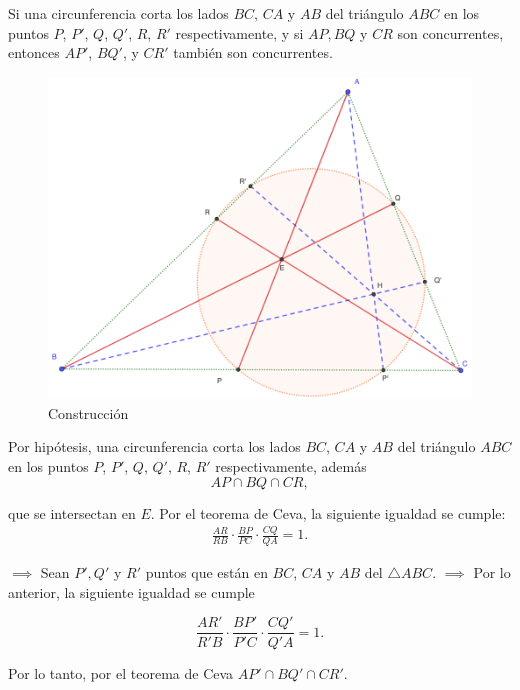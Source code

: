 \begin{problema}
	Si una circunferencia corta los lados $BC$, $CA$ y $AB$ del triángulo $ABC$ en los puntos $P$, $P'$, $Q$, $Q'$, $R$, $R'$ respectivamente, y si $AP, BQ$ y $CR$ son concurrentes, entonces $AP'$, $BQ'$, y $CR'$ también son concurrentes.
		\begin{figure}[H]
		\centering
		\includegraphics[scale=0.3]{Images/4}
		\caption{Construcción}
	\end{figure}
	
\end{problema}


\begin{dem}
	Por hipótesis, una circunferencia corta los lados $BC$, $CA$ y $AB$ del triángulo $ABC$ en los puntos $P$, $P'$, $Q$, $Q'$, $R$, $R'$ respectivamente, además 
	$$AP\cap BQ \cap CR,$$
	
	que se intersectan en $E$. Por el teorema de Ceva, la siguiente igualdad se cumple: 
	\begin{gather}
		\frac{AR}{RB}\cdot\frac{BP}{PC}\cdot\frac{CQ}{QA} =1.
	\end{gather}
	
	$\implies$ 
	Sean $P',Q'$ y $R'$ puntos que están en $BC$, $CA$ y $AB$ del $\triangle ABC$. 	$\implies$  Por lo anterior, la siguiente igualdad se cumple
	
	$$\frac{AR'}{R'B}\cdot\frac{BP'}{P'C}\cdot\frac{CQ'}{Q'A} =1. $$
	
	Por lo tanto, por el teorema de Ceva $AP'\cap BQ' \cap CR'$. 
\end{dem}






